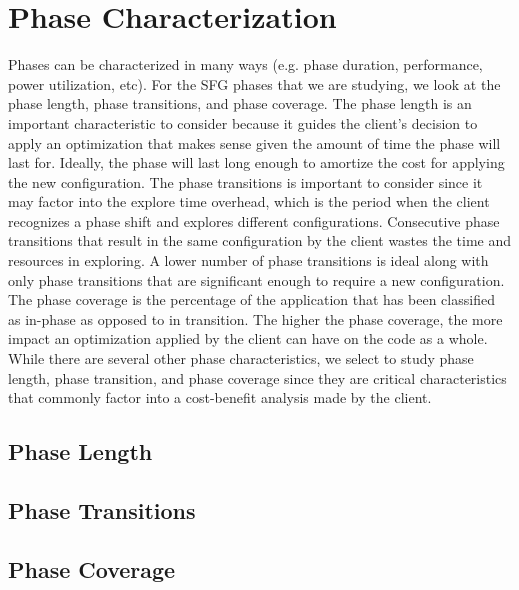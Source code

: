 \section{Phase Characterization}

Phases can be characterized in many ways (e.g. phase duration, performance, power utilization, etc). For the SFG phases that we are studying, we look at the phase length, phase transitions, and phase coverage. The phase length is an important characteristic to consider because it guides the client's decision to apply an optimization that makes sense given the amount of time the phase will last for. Ideally, the phase will last long enough to amortize the cost for applying the new configuration. The phase transitions is important to consider since it may factor into the explore time overhead, which is the period when the client recognizes a phase shift and explores different configurations. Consecutive phase transitions that result in the same configuration by the client wastes the time and resources in exploring. A lower number of phase transitions is ideal along with only phase transitions that are significant enough to require a new configuration. The phase coverage is the percentage of the application that has been classified as in-phase as opposed to in transition. The higher the phase coverage, the more impact an optimization applied by the client can have on the code as a whole. While there are several other phase characteristics, we select to study phase length, phase transition, and phase coverage since they are critical characteristics that commonly factor into a cost-benefit analysis made by the client.       

\subsection{Phase Length}


\subsection{Phase Transitions}



\subsection{Phase Coverage}


